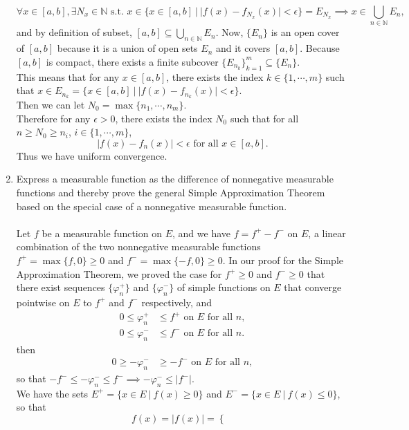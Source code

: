 \begin{enumerate}
    \[
        \forall x\in[a,b],\exists N_x\in\mathbb{N}\text{ s.t. }x\in\{x\in[a,b]\ |\ |f(x)-f_{N_x}(x)|<\epsilon\}=E_{N_x}\implies x\in\bigcup_{n\in\mathbb{N}} E_n,
    \]
    and by definition of subset, $[a,b]\subseteq \bigcup_{n\in\mathbb{N}} E_n$.
    Now, $\{E_n\}$ is an open cover of $[a,b]$ because it is a union of open sets $E_n$ and it covers $[a,b]$.
    Because $[a,b]$ is compact, there exists a finite subcover $\{E_{n_k}\}_{k=1}^m\subseteq\{E_n\}$. 
    \\This means that for any $x\in[a,b]$, there exists the index $k\in\{1,\cdots,m\}$ such that $x\in E_{n_k}=\{x\in[a,b]\ |\ |f(x)-f_{n_k}(x)|<\epsilon\}$.
    \\Then we can let $N_0=\max\{n_1,\cdots,n_m\}$.
    \\Therefore for any $\epsilon>0$, there exists the index $N_0$ such that for all $n\ge N_0\ge n_i$, $i\in\{1,\cdots,m\}$,
    \[
        |f(x)-f_n(x)|<\epsilon\text{ for all }x\in[a,b].
    \]
    Thus we have uniform convergence.
    \item Express a measurable function as the difference of nonnegative measurable functions and thereby prove the general Simple Approximation Theorem based on the special case of a nonnegative measurable function.\\
    \\Let $f$ be a measurable function on $E$, and we have $f=f^+-f^-$ on $E$, a linear combination of the two nonnegative measurable functions $f^+=\max\{f,0\}\ge0$ and $f^-=\max\{-f,0\}\ge0$.
    In our proof for the Simple Approximation Theorem, we proved the case for $f^+\ge0$ and $f^-\ge0$ that there exist sequences $\{\varphi^+_n\}$ and $\{\varphi^-_n\}$ of simple functions on $E$ that converge pointwise on $E$ to $f^+$ and $f^-$ respectively, and 
    \begin{align*}
        0\le\varphi^+_n&\le f^+\text{ on }E\text{ for all }n,\\
        0\le\varphi^-_n&\le f^-\text{ on }E\text{ for all }n.
    \end{align*}
    then
    \begin{align*}
        0\ge-\varphi^-_n&\ge -f^-\text{ on }E\text{ for all }n,
    \end{align*}
    so that $-f^-\le-\varphi^-_n\le f^-\implies -\varphi^-_n \le |f^-|$.
    \\We have the sets $E^+=\{x\in E\ |\ f(x)\ge0\}$ and $E^-=\{x\in E\ |\ f(x)\le0\}$, so that
    \[
        f(x)=|f(x)|=
        \begin{cases}

\end{cases}\]
\end{enumerate}
